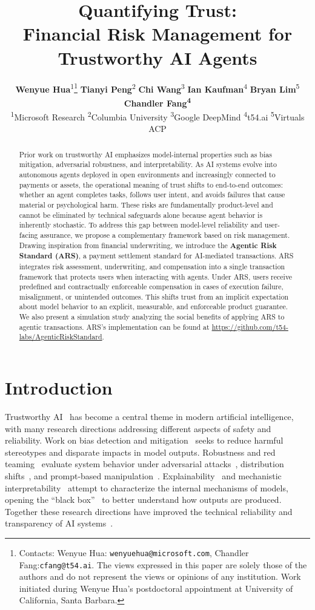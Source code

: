 \documentclass{article} %
\title{Quantifying Trust: \\Financial Risk Management for Trustworthy AI Agents}
\author{%
\textbf{Wenyue Hua}\textsuperscript{1}\thanks{Contacts: Wenyue Hua: \texttt{wenyuehua@microsoft.com}, Chandler Fang:\texttt{cfang@t54.ai}. The views expressed in this paper are solely those of the authors and do not represent the views or opinions of any institution. Work initiated during Wenyue Hua's postdoctoral appointment at University of California, Santa Barbara.
}\quad 
\textbf{Tianyi Peng}\textsuperscript{2} \quad 
\textbf{Chi Wang}\textsuperscript{3} \quad 
\textbf{Ian Kaufman}\textsuperscript{4} \quad
\textbf{Bryan Lim}\textsuperscript{5} \quad 
\textbf{Chandler Fang}\textsuperscript{\textbf{4}} \\
\textsuperscript{1}Microsoft Research \quad 
\textsuperscript{2}Columbia University \quad
\textsuperscript{3}Google DeepMind \quad
\textsuperscript{4}t54.ai \quad
\textsuperscript{5}Virtuals ACP \quad \\
}
\begin{document}
\ifcolmsubmission
\linenumbers
\fi

\maketitle

\begin{abstract}

Prior work on trustworthy AI emphasizes model-internal properties such as bias mitigation, adversarial robustness, and interpretability. As AI systems evolve into autonomous agents deployed in open environments and increasingly connected to payments or assets, the operational meaning of trust shifts to end-to-end outcomes: whether an agent completes tasks, follows user intent, and avoids failures that cause material or psychological harm. These risks are fundamentally product-level and cannot be eliminated by technical safeguards alone because agent behavior is inherently stochastic. To address this gap between model-level reliability and user-facing assurance, we propose a complementary framework based on risk management. Drawing inspiration from financial underwriting, we introduce the \textbf{Agentic Risk Standard (ARS)}, a payment settlement standard for AI-mediated transactions. ARS integrates risk assessment, underwriting, and compensation into a single transaction framework that protects users when interacting with agents. Under ARS, users receive predefined and contractually enforceable compensation in cases of execution failure, misalignment, or unintended outcomes. This shifts trust from an implicit expectation about model behavior to an explicit, measurable, and enforceable product guarantee. We also present a simulation study analyzing the social benefits of applying ARS to agentic transactions. ARS's implementation can be found at \url{https://github.com/t54-labs/AgenticRiskStandard}.

\end{abstract}

\section{Introduction}

Trustworthy AI~\citep{li2023trustworthy} has become a central theme in modern artificial intelligence, with many research directions addressing different aspects of safety and reliability. Work on bias detection and mitigation~\citep{lin2025investigating, kumar2024decoding} seeks to reduce harmful stereotypes and disparate impacts in model outputs. Robustness and red teaming~\citep{chen2024agentpoison, ge2024mart} evaluate system behavior under adversarial attacks~\citep{kumar2023certifying}, distribution shifts~\citep{ren2025llms}, and prompt-based manipulation~\citep{liu2023prompt, greshake2023not}. Explainability~\citep{bilal2025llms, mumuni2025explainable} and mechanistic interpretability~\citep{singh2024rethinking, dunefsky2024transcoders} attempt to characterize the internal mechanisms of models, opening the ``black box''~\citep{gat2023faithful, bhattacharjee2023towards} to better understand how outputs are produced. Together these research directions have improved the technical reliability and transparency of AI systems~\citep{ahn2024impact, cau2023effects}.
\end{document}
